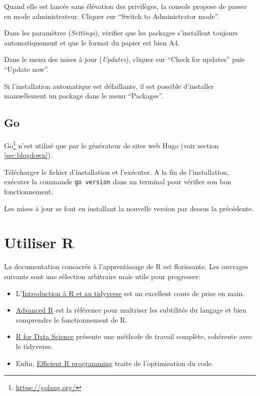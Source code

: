 \documentclass[
  12pt,
  french,
  a4paper,
  extrafontsizes,onecolumn,openright
  ]{memoir}
\providecommand{\tightlist}{%
  \setlength{\itemsep}{0pt}\setlength{\parskip}{0pt}}
\begin{document}
Quand elle est lancée sans élévation des privilèges, la console propose de passer en mode administrateur.
Cliquer sur \enquote{Switch to Administrator mode}.

Dans les paramètres (\emph{Settings}), vérifier que les packages s'installent toujours automatiquement et que le format du papier est bien A4.

Dans le menu des mises à jour (\emph{Updates}), cliquer sur \enquote{Check for updates} puis \enquote{Update now}.

Si l'installation automatique est défaillante, il est possible d'installer manuellement un package dans le menu \enquote{Packages}.

\hypertarget{go}{%
\section{Go}\label{go}}

Go\footnote{\url{https://golang.org/}} n'est utilisé que par le générateur de sites web Hugo (voir section \ref{sec:blogdown}).

Télécharger le fichier d'installation et l'exécuter.
A la fin de l'installation, exécuter la commande \texttt{go\ version} dans un terminal pour vérifier son bon fonctionnement.

Les mises à jour se font en installant la nouvelle version par dessus la précédente.

\hypertarget{chap:utiliseR}{%
\chapter{Utiliser R}\label{chap:utiliseR}}

La documentation consacrée à l'apprentissage de R est florissante.
Les ouvrages suivants sont une sélection arbitraire mais utile pour progresser:

\begin{itemize}
\tightlist
\item
  L'\href{https://juba.github.io/tidyverse/}{Introduction à R et au tidyverse} \autocite{Barnier2020} est un excellent cours de prise en main.
\item
  \href{http://adv-r.had.co.nz/}{Advanced R} \autocite{Wickham2014} est la référence pour maîtriser les subtilités du langage et bien comprendre le fonctionnement de R.
\item
  \href{https://r4ds.had.co.nz/}{R for Data Science} \autocite{Wickham2016} présente une méthode de travail complète, cohérente avec le tidyverse.
\item
  Enfin, \href{https://csgillespie.github.io/efficientR/}{Efficient R programming} \autocite{Gillespie2016} traite de l'optimisation du code.
\end{itemize}
\end{document}
